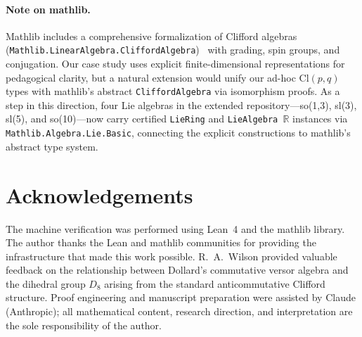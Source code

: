 \documentclass[runningheads]{llncs}
\begin{document}
\paragraph{Note on mathlib.} Mathlib includes a comprehensive formalization of
Clifford algebras (\texttt{Mathlib.LinearAlgebra.CliffordAlgebra})~\cite{wieser2021clifford}
with grading, spin groups, and conjugation. Our case study uses explicit
finite-dimensional representations for pedagogical clarity, but a natural
extension would unify our ad-hoc $\mathrm{Cl}(p,q)$ types with mathlib's
abstract \texttt{CliffordAlgebra} via isomorphism proofs. As a step in this
direction, four Lie algebras in the extended repository---so(1,3), sl(3),
sl(5), and so(10)---now carry certified \texttt{LieRing} and
\texttt{LieAlgebra~$\mathbb{R}$} instances via
\texttt{Mathlib.Algebra.Lie.Basic}, connecting the explicit constructions to
mathlib's abstract type system.

\section*{Acknowledgements}

The machine verification was performed using Lean~4 and the mathlib
library. The author thanks the Lean and mathlib communities for providing
the infrastructure that made this work possible.
R.~A.~Wilson provided valuable feedback on the relationship between
Dollard's commutative versor algebra and the dihedral group $D_8$
arising from the standard anticommutative Clifford structure.
Proof engineering and manuscript preparation were assisted by Claude
(Anthropic); all mathematical content, research direction, and
interpretation are the sole responsibility of the author.

\end{document}
